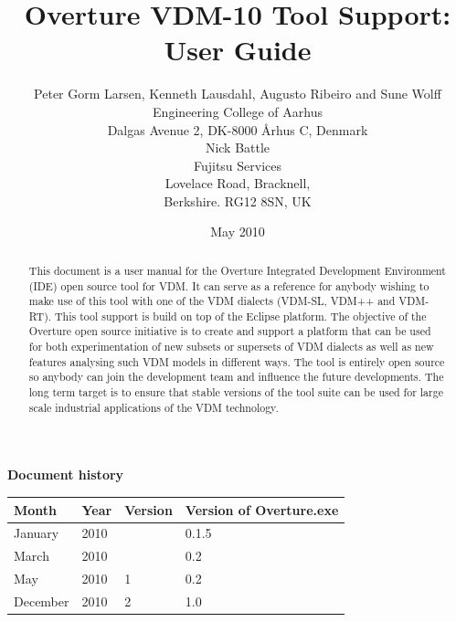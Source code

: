 \documentclass{overturerepchap}
\begin{document}
\title{Overture VDM-10 Tool Support: User Guide}
\author{Peter Gorm Larsen, Kenneth Lausdahl, Augusto Ribeiro and Sune Wolff \\ 
Engineering College of Aarhus\\
Dalgas Avenue 2, DK-8000 \AA{}rhus C, Denmark\\[3mm]
Nick Battle\\
Fujitsu Services\\
Lovelace Road, Bracknell, \\
Berkshire. RG12 8SN, UK}

\date{May 2010}


\maketitle


\textbf{Document history}

\begin{tabular}{|l|l|l|l|}\hline
Month   & Year & Version & Version of Overture.exe \\ \hline
January & 2010 &         & 0.1.5 \\ \hline
March   & 2010 &         & 0.2   \\ \hline
May     & 2010 & 1       & 0.2   \\ \hline
December& 2010 & 2       & 1.0   \\ \hline
\end{tabular}

\tableofcontents

\begin{abstract}
This document is a user manual for the Overture Integrated Development
Environment (IDE) open source tool for
VDM. It can serve as a reference for anybody wishing to make use of
this tool with one of the VDM dialects (VDM-SL, VDM++ and VDM-RT).
This tool support is build on top of the Eclipse platform. The
objective of the Overture open source initiative is to create and support a
platform that can be used for both experimentation of new subsets or
supersets of VDM dialects as well as new features analysing such VDM
models in different ways. The tool is entirely open source so anybody
can join the development team and influence the future
developments. The long term target is to ensure that stable
versions of the tool suite can be used for large scale industrial
applications of the VDM technology.
\end{abstract}
\end{document}
